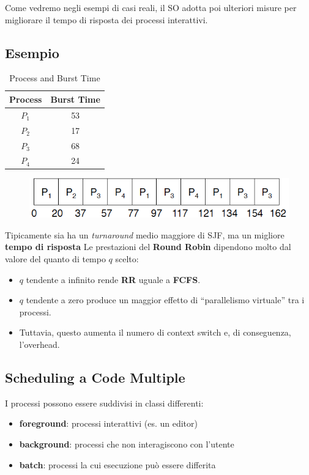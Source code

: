 Come vedremo negli esempi di casi reali, il SO adotta poi ulteriori misure per migliorare il tempo di risposta dei processi interattivi.

\subsection{Esempio}
\begin{table}[h]
    \centering
    \begin{tabular}{|c|c|}
        \hline
        \textbf{Process} & \textbf{Burst Time} \\
        \hline
        $P_1$ & 53 \\
        $P_2$ & 17 \\
        $P_3$ & 68 \\
        $P_4$ & 24 \\
        \hline
    \end{tabular}
    \caption{Process and Burst Time}
    \label{tab:process_burst_time}
\end{table}
\begin{figure}[h]
    \centering
    \includegraphics[width=0.25\linewidth]{images/RR_20.png}
\end{figure}
Tipicamente sia ha un \textit{turnaround} medio maggiore di SJF, ma un migliore \textbf{tempo di risposta}
Le prestazioni del \textbf{Round Robin} dipendono molto dal valore del quanto di tempo \( q \) scelto:
\begin{itemize}
    \item \( q \) tendente a infinito rende \textbf{RR} uguale a \textbf{FCFS}.
    \item \( q \) tendente a zero produce un maggior effetto di “parallelismo virtuale” tra i processi.
    \item Tuttavia, questo aumenta il numero di context switch e, di conseguenza, l'overhead.
\end{itemize}

\subsection{Scheduling a Code Multiple}

I processi possono essere suddivisi in classi differenti:
\begin{itemize}
    \item \textbf{foreground}: processi interattivi (es. un editor)
    \item \textbf{background}: processi che non interagiscono con l'utente
    \item \textbf{batch}: processi la cui esecuzione può essere differita
\end{itemize}

